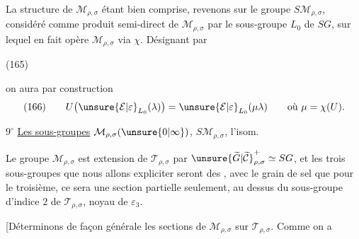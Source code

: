 La structure de $\mathcal M_{\rho,\sigma}$ étant bien comprise,
revenons sur le groupe $S\mathcal M_{\rho,\sigma}$, considéré comme
produit semi-direct de $\mathcal M_{\rho,\sigma}$ par le sous-groupe
$L_0$ de $SG$, sur lequel en fait opère $\mathcal M_{\rho,\sigma}$
via $\chi$. Désignant par

\noindent (165)\quad
{}

on aura par  construction
\[
\text{(166)}\qquad
U\bigl(\unsure{\mathcal E|\varepsilon}_{L_0}(\lambda)\bigr)
=\unsure{\mathcal E|\varepsilon}_{L_0}(\mu\lambda)
\qquad\text{où }\mu=\chi(U).
\]




 \textcircled{$9^\circ$} \uline{Les sous-groupes}
$\mathcal M_{\rho,\sigma}(\unsure{0|\infty})$,
$S\mathcal M_{\rho,\sigma}$, l'isom.

Le groupe $\mathcal M_{\rho,\sigma}$ est extension de $\mathcal T_{\rho,\sigma}$ par
$\unsure{\widetilde G|\widetilde{\mathcal C}}^+_{\rho,\sigma}\simeq SG$, et les trois sous-groupes que nous allons
expliciter seront des ,  avec le
grain de sel que pour le troisième, ce sera une
section partielle seulement, au dessus du
sous-groupe  d'indice $2$ de $\mathcal T_{\rho,\sigma}$, noyau de
$\varepsilon_3$.

[Déterminons de façon générale les sections
de $\mathcal M_{\rho,\sigma}$ sur $\mathcal T_{\rho,\sigma}$. Comme on a

